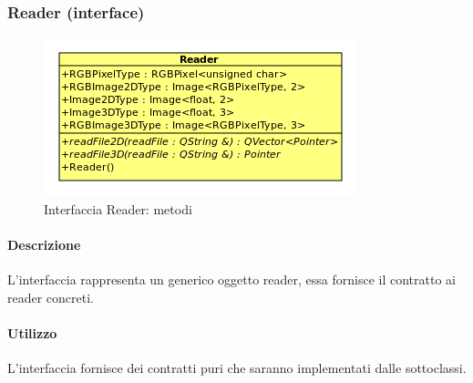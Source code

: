 \pagebreak
\subsubsection{Reader (interface)}
\label{spereader}
\begin{figure}[!h]
\centering
			\includegraphics[scale=5]{./Content/Immagini/model/Reader.png}
			\caption{Interfaccia Reader: metodi}
			\label{cl_reader}
\end{figure}
\paragraph{Descrizione \\}
L'interfaccia rappresenta un generico oggetto reader, essa fornisce il contratto ai reader concreti.
\paragraph{Utilizzo\\}
L'interfaccia fornisce dei contratti puri che saranno implementati dalle sottoclassi.

